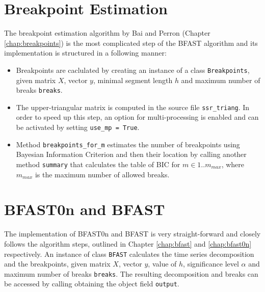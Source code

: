 \documentclass[main.tex]{subfiles}
\begin{document}
\section{Breakpoint Estimation}
\label{sec:impl_breakpoints}
The breakpoint estimation algorithm by Bai and Perron (Chapter
\ref{chap:breakpoints}) is the most complicated step of the BFAST
algorithm and its implementation is structured in a following manner:
\begin{itemize}
\item Breakpoints are caclulated by creating an instance of a class
  \texttt{Breakpoints}, given matrix $X$, vector $y$, minimal segment length $h$
  and maximum number of breaks \texttt{breaks}.
\item The upper-triangular matrix is computed in the source file
  \texttt{ssr\_triang}. In order to speed up this step, an option for
  multi-processing is enabled and can be activated by setting \texttt{use\_mp = True}.
\item Method \texttt{breakpoints\_for\_m} estimates the number of
  breakpoints using Bayesian Information Criterion and then their location by
  calling another method \texttt{summary} that calculates the table of BIC for
  $m \in 1..m_{max}$, where $m_{max}$ is the maximum number of allowed breaks.
\end{itemize}


\section{BFAST0n and BFAST}
\label{sec:impl_bfast}
The implementation of BFAST0n and BFAST is very straight-forward and closely follows the
algorithm steps, outlined in Chapter \ref{chap:bfast} and  \ref{chap:bfast0n}
respectively. An instance of class \texttt{BFAST} calculates the time series
decomposition and the breakpoints, given matrix $X$, vector $y$, value of $h$,
significance level $\alpha$ and maximum number of breaks \texttt{breaks}.
The resulting decomposition and breaks can be accessed by calling obtaining the
object field \texttt{output}.

\biblio
\end{document}
